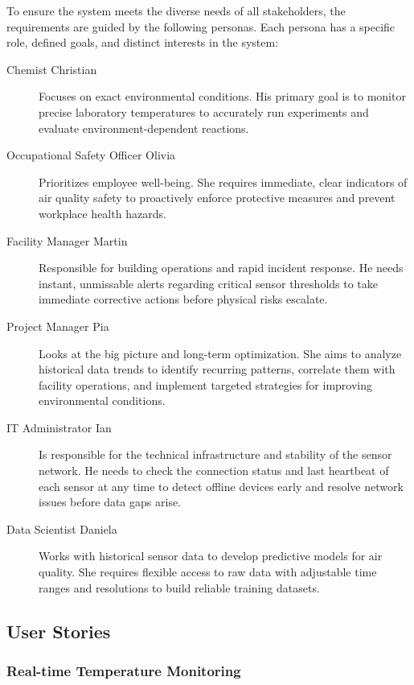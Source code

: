 \documentclass[conference,a4paper,flushend]{cs-techrep} %
\begin{document}
To ensure the system meets the diverse needs of all stakeholders, the requirements are guided by the following personas. 
Each persona has a specific role, defined goals, and distinct interests in the system:

\begin{description}
    \item[Chemist Christian] 
    Focuses on exact environmental conditions. His primary goal is to monitor precise laboratory temperatures to accurately 
    run experiments and evaluate environment-dependent reactions.
    \item[Occupational Safety Officer Olivia] 
    Prioritizes employee well-being. She requires immediate, clear indicators of air quality safety to proactively enforce 
    protective measures and prevent workplace health hazards.
    \item[Facility Manager Martin] 
    Responsible for building operations and rapid incident response. He needs instant, unmissable alerts regarding critical 
    sensor thresholds to take immediate corrective actions before physical risks escalate.
    \item[Project Manager Pia] 
    Looks at the big picture and long-term optimization. She aims to analyze historical data trends to identify recurring 
    patterns, correlate them with facility operations, and implement targeted strategies for improving environmental conditions.
    \item[IT Administrator Ian]
    Is responsible for the technical infrastructure and stability of the sensor network. 
    He needs to check the connection status and last heartbeat of each sensor at any time 
    to detect offline devices early and resolve network issues before data gaps arise.
    \item[Data Scientist Daniela]
    Works with historical sensor data to develop predictive models for air quality. 
    She requires flexible access to raw data with adjustable time ranges and resolutions 
    to build reliable training datasets.
    
\end{description}


\subsection{User Stories}\label{sec:user_stories}

\subsubsection{Real-time Temperature Monitoring}\label{sec:us_01}
\end{document}
